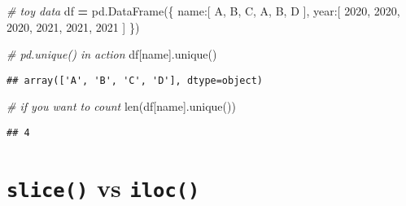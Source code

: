 \documentclass[
]{book}
\newenvironment{Shaded}{\begin{snugshade}}{\end{snugshade}}
\newcommand{\BuiltInTok}[1]{#1}
\newcommand{\CommentTok}[1]{\textcolor[rgb]{0.56,0.35,0.01}{\textit{#1}}}
\newcommand{\DecValTok}[1]{\textcolor[rgb]{0.00,0.00,0.81}{#1}}
\newcommand{\NormalTok}[1]{#1}
\newcommand{\OperatorTok}[1]{\textcolor[rgb]{0.81,0.36,0.00}{\textbf{#1}}}
\newcommand{\StringTok}[1]{\textcolor[rgb]{0.31,0.60,0.02}{#1}}
\begin{document}
\begin{Shaded}
\begin{Highlighting}[]
\CommentTok{\# toy data}
\NormalTok{df }\OperatorTok{=}\NormalTok{ pd.DataFrame(\{}
    \StringTok{\textquotesingle{}name\textquotesingle{}}\NormalTok{:[}
        \StringTok{\textquotesingle{}A\textquotesingle{}}\NormalTok{, }\StringTok{\textquotesingle{}B\textquotesingle{}}\NormalTok{, }\StringTok{\textquotesingle{}C\textquotesingle{}}\NormalTok{,}
        \StringTok{\textquotesingle{}A\textquotesingle{}}\NormalTok{, }\StringTok{\textquotesingle{}B\textquotesingle{}}\NormalTok{, }\StringTok{\textquotesingle{}D\textquotesingle{}}
\NormalTok{    ],}
    \StringTok{\textquotesingle{}year\textquotesingle{}}\NormalTok{:[}
        \DecValTok{2020}\NormalTok{, }\DecValTok{2020}\NormalTok{, }\DecValTok{2020}\NormalTok{,}
        \DecValTok{2021}\NormalTok{, }\DecValTok{2021}\NormalTok{, }\DecValTok{2021}
\NormalTok{    ]}
\NormalTok{\})}
\end{Highlighting}
\end{Shaded}

\begin{Shaded}
\begin{Highlighting}[]
\CommentTok{\# pd.unique() in action}
\NormalTok{df[}\StringTok{\textquotesingle{}name\textquotesingle{}}\NormalTok{].unique()}
\end{Highlighting}
\end{Shaded}

\begin{verbatim}
## array(['A', 'B', 'C', 'D'], dtype=object)
\end{verbatim}

\begin{Shaded}
\begin{Highlighting}[]
\CommentTok{\# if you want to count}
\BuiltInTok{len}\NormalTok{(df[}\StringTok{\textquotesingle{}name\textquotesingle{}}\NormalTok{].unique())}
\end{Highlighting}
\end{Shaded}

\begin{verbatim}
## 4
\end{verbatim}

\hypertarget{slice-vs-iloc}{%
\section{\texorpdfstring{\texttt{slice()} vs \texttt{iloc()}}{slice() vs iloc()}}\label{slice-vs-iloc}}
\end{document}
